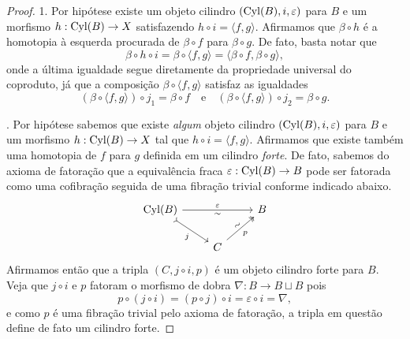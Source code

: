 \begin{proof}
  1. Por hipótese existe um objeto cilindro $(\mathrm{Cyl}(B),i,\varepsilon)$ para $B$ e um morfismo $h: \mathrm{Cyl}(B) \to X$ satisfazendo $h \circ i = \langle f,g \rangle$.
  Afirmamos que $\beta \circ h$ é a homotopia à esquerda procurada de $\beta \circ f$ para $\beta \circ g$.
  De fato, basta notar que
  \begin{displaymath}
    \beta \circ h \circ i = \beta \circ \langle f,g \rangle = \langle \beta \circ f, \beta \circ g \rangle,
  \end{displaymath}
  onde a última igualdade segue diretamente da propriedade universal do coproduto, já que a composição $\beta \circ \langle f,g \rangle$ satisfaz as igualdades
  \begin{displaymath}
    (\beta \circ \langle f,g \rangle) \circ j_{1} = \beta \circ f \quad \text{e} \quad (\beta \circ \langle f,g \rangle) \circ j_{2} = \beta \circ g.
  \end{displaymath}

  . Por hipótese sabemos que existe \emph{algum} objeto cilindro $(\mathrm{Cyl}(B),i,\varepsilon)$ para $B$ e um morfismo $h: \mathrm{Cyl}(B) \to X$ tal que $h \circ i = \langle f,g \rangle$.
  Afirmamos que existe também uma homotopia de $f$ para $g$ definida em um cilindro \emph{forte}.
  De fato, sabemos do axioma de fatoração que a equivalência fraca $\varepsilon: \mathrm{Cyl}(B) \to B$ pode ser fatorada como uma cofibração seguida de uma fibração trivial conforme indicado abaixo.
  \begin{displaymath}
    \begin{tikzcd}
      \Cyl(B)
      \arrow[rr, "\varepsilon", "\sim" {swap}]
      \arrow[rd, tail, "j" swap]
      & & B
      \\ & C
      \arrow[ru, two heads, "p" {swap}, "\sim" {sloped}]
    \end{tikzcd}
  \end{displaymath}
  Afirmamos então que a tripla $(C,j \circ i,p)$ é um objeto cilindro forte para $B$.
  Veja que $j \circ i$ e $p$ fatoram o morfismo de dobra $\nabla: B \to B \sqcup B$ pois
  \begin{displaymath}
    p \circ (j \circ i) = (p \circ j) \circ i = \varepsilon \circ i = \nabla,
  \end{displaymath}
  e como $p$ é uma fibração trivial pelo axioma de fatoração, a tripla em questão define de fato um cilindro forte.


\end{proof}
